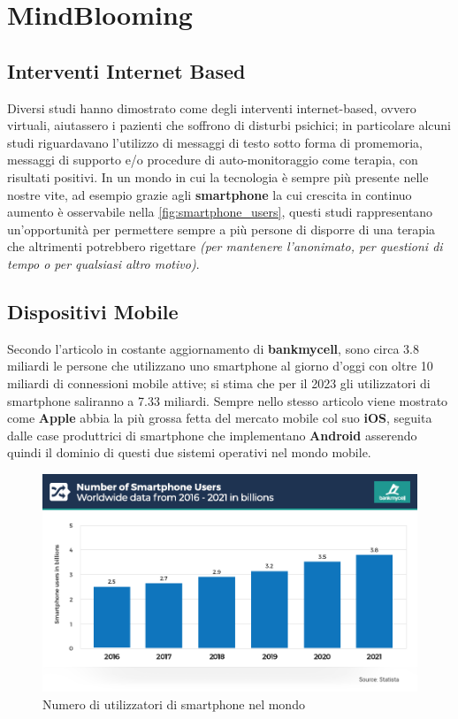 \chapter{MindBlooming}
\section{Interventi Internet Based}

Diversi studi hanno dimostrato come degli interventi internet-based, ovvero virtuali, aiutassero i pazienti che soffrono di disturbi psichici\cite{taylor2003computer}; in particolare alcuni studi riguardavano l'utilizzo di messaggi di testo sotto forma di promemoria, messaggi di supporto e/o procedure di auto-monitoraggio come terapia, con risultati positivi.
In un mondo in cui la tecnologia è sempre più presente nelle nostre vite, ad esempio grazie agli \textbf{smartphone} la cui crescita in continuo aumento è osservabile nella \autoref{fig:smartphone_users}, questi studi rappresentano un'opportunità per permettere sempre a più persone di disporre di una terapia che altrimenti potrebbero rigettare \textit{(per mantenere l'anonimato, per questioni di tempo o per qualsiasi altro motivo)}.

\section{Dispositivi Mobile}
Secondo l'articolo in costante aggiornamento di \textbf{bankmycell}\cite{bankmycell}, sono circa 3.8 miliardi le persone che utilizzano uno smartphone al giorno d'oggi con oltre 10 miliardi di connessioni mobile attive; si stima che per il 2023 gli utilizzatori di smartphone saliranno a 7.33 miliardi. Sempre nello stesso articolo viene mostrato come \textbf{Apple} abbia la più grossa fetta del mercato mobile col suo \textbf{iOS}, seguita dalle case produttrici di smartphone che implementano \textbf{Android} asserendo quindi il dominio di questi due sistemi operativi nel mondo mobile.

\begin{figure}
\centering
\includegraphics[width=\textwidth]{img/smartphone_users}
\caption{Numero di utilizzatori di smartphone nel mondo \cite{bankmycell}}
\label{fig:smartphone_users}
\end{figure}


